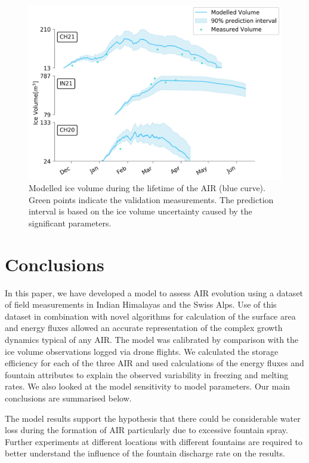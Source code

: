 \documentclass[utf8]{frontiersSCNS} %
\begin{document}
\begin{figure}[h] 
    \begin{center} 
    \includegraphics[width=\linewidth]{Figures/icev_results.jpg} 
\end{center}
  \caption{Modelled ice volume during the lifetime of the AIR (blue curve). Green points indicate the validation
  measurements. The prediction interval is based on the ice volume uncertainty caused by the significant parameters.  } 
\label{fig:results} 
\end{figure}

\section{Conclusions} 
In this paper, we have developed a model to assess AIR evolution using a dataset of field measurements in Indian
Himalayas and the Swiss Alps. Use of this dataset in combination with novel algorithms for calculation of the surface
area and energy fluxes allowed an accurate representation of the complex growth dynamics typical of any AIR. The model
was calibrated by comparison with the ice volume observations logged via drone flights. We calculated the storage
efficiency for each of the three AIR and used calculations of the energy fluxes and fountain attributes to explain the
observed variability in freezing and melting rates. We also looked at the model sensitivity to model parameters. Our
main conclusions are summarised below.

The model results support the hypothesis that there could be considerable water loss during the formation of AIR
particularly due to excessive fountain spray. Further experiments at different locations with different fountains are
required to better understand the influence of the fountain discharge rate on the results. 
\end{document}
